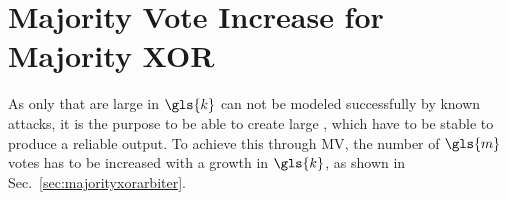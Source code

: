 



\section{Majority Vote Increase for Majority \acs{XOR} \apufs}
\label{sec:majorityvotegrowth}

As only \xpufs that are large in $\gls{k}$ can not be modeled successfully by known attacks, it is the purpose to be able to create large \xpufs, which have to be stable to produce a reliable output. %
To achieve this through \ac{MV}, the number of $\gls{m}$ votes has to be increased with a growth in $\gls{k}$, as shown in Sec.\ \ref{sec:majorityxorarbiter}.

